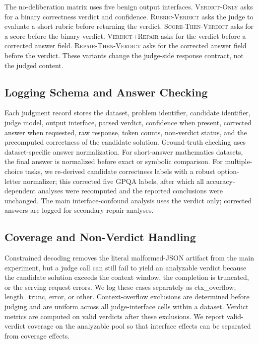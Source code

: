 \documentclass[journal]{IEEEtran}
\begin{document}
The no-deliberation matrix uses five benign output interfaces. \textsc{Verdict-Only} asks for a binary correctness verdict and confidence. \textsc{Rubric-Verdict} asks the judge to evaluate a short rubric before returning the verdict. \textsc{Score-Then-Verdict} asks for a score before the binary verdict. \textsc{Verdict+Repair} asks for the verdict before a corrected answer field. \textsc{Repair-Then-Verdict} asks for the corrected answer field before the verdict. These variants change the judge-side response contract, not the judged content.

\subsection{Logging Schema and Answer Checking}
\label{sec:logging}

Each judgment record stores the dataset, problem identifier, candidate identifier, judge model, output interface, parsed verdict, confidence when present, corrected answer when requested, raw response, token counts, non-verdict status, and the precomputed correctness of the candidate solution. Ground-truth checking uses dataset-specific answer normalization. For short-answer mathematics datasets, the final answer is normalized before exact or symbolic comparison. For multiple-choice tasks, we re-derived candidate correctness labels with a robust option-letter normalizer; this corrected five GPQA labels, after which all accuracy-dependent analyses were recomputed and the reported conclusions were unchanged. The main interface-confound analysis uses the verdict only; corrected answers are logged for secondary repair analyses.

\subsection{Coverage and Non-Verdict Handling}
\label{sec:parse-handling}

Constrained decoding removes the literal malformed-JSON artifact from the main experiment, but a judge call can still fail to yield an analyzable verdict because the candidate solution exceeds the context window, the completion is truncated, or the serving request errors. We log these cases separately as ctx\_overflow, length\_trunc, error, or other. Context-overflow exclusions are determined before judging and are uniform across all judge-interface cells within a dataset. Verdict metrics are computed on valid verdicts after these exclusions. We report valid-verdict coverage on the analyzable pool so that interface effects can be separated from coverage effects.
\end{document}
